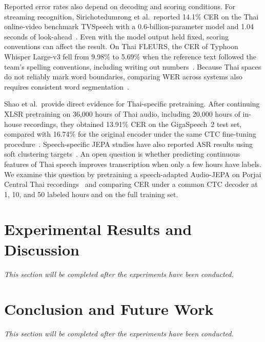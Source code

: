 \documentclass[conference]{IEEEtran}
\begin{document}
Reported error rates also depend on decoding and scoring conditions. For streaming recognition, Sirichotedumrong et al.\ reported 14.1\% CER on the Thai online-video benchmark TVSpeech with a 0.6-billion-parameter model and 1.04 seconds of look-ahead~\cite{sirichotedumrong2026streaming}. Even with the model output held fixed, scoring conventions can affect the result. On Thai FLEURS, the CER of Typhoon Whisper Large-v3 fell from 9.98\% to 5.69\% when the reference text followed the team's spelling conventions, including writing out numbers~\cite{sirichotedumrong2026typhoon}. Because Thai spaces do not reliably mark word boundaries, comparing WER across systems also requires consistent word segmentation~\cite{jongtaveesataporn2008news}.

Shao et al.\ provide direct evidence for Thai-specific pretraining. After continuing XLSR pretraining on 36{,}000 hours of Thai audio, including 20{,}000 hours of in-house recordings, they obtained 13.91\% CER on the GigaSpeech~2 test set, compared with 16.74\% for the original encoder under the same CTC fine-tuning procedure~\cite{shao2025xlsrthai}. Speech-specific JEPA studies have also reported ASR results using soft clustering targets~\cite{ioannides2026gmmjepa,ioannides2026sjepa}. An open question is whether predicting continuous features of Thai speech improves transcription when only a few hours have labels. We examine this question by pretraining a speech-adapted Audio-JEPA on Porjai Central Thai recordings~\cite{porjai} and comparing CER under a common CTC decoder at 1, 10, and 50 labeled hours and on the full training set.



\section{Experimental Results and Discussion}
\label{sec:results}
\textit{This section will be completed after the experiments have been conducted.}

\section{Conclusion and Future Work}
\label{sec:conclusion}
\textit{This section will be completed after the experiments have been conducted.}
\end{document}
